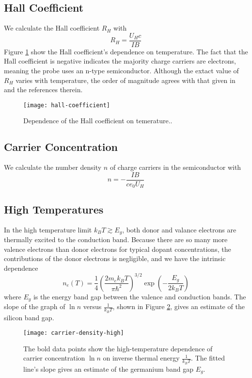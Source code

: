\documentclass[11pt, a4paper]{article}
\begin{document}
\subsection{Hall Coefficient}
We calculate the Hall coefficient $ R_{H} $ with
\begin{equation*}
	R_{H} =  \frac{U_{H}c}{IB}
\end{equation*}
Figure \ref{hall:fig:coefficient} show the Hall coefficient's dependence on temperature.  The fact that the Hall coefficient is negative indicates the majority charge carriers are electrons, meaning the probe uses an n-type semiconductor. Although the extact value of $ R_{H} $ varies with temperature, the order of magnitude agrees with that given in \cite{kuck} and the references therein.
\begin{figure}
\centering
\texttt{[image: hall-coefficient]}
\caption{Dependence of the Hall coefficient on temerature..}
\label{hall:fig:coefficient}
\end{figure}


\subsection{Carrier Concentration}
We calculate the number density $ n $ of charge carriers in the semiconductor with
\begin{equation*}
	n = -\frac{IB}{ce_{0}U_{H}}
\end{equation*}	

\subsection{High Temperatures}	
In the high temperature limit $ k_{B}T \gtrsim E_{g} $, both donor and valance electrons are thermally excited to the conduction band. Because there are so many more valence electrons than donor electrons for typical dopant concentrations, the contributions of the donor electrons is negligible, and we have the intrinsic dependence
\begin{equation*}
	n_{e}(T) = \frac{1}{4}\left(\frac{2m_{e}k_{B}T}{\pi \hbar^{2}}\right)^{3/2}\exp(-\frac{E_{g}}{2k_{B}T})
\end{equation*}
where $ E_{g} $ is the energy band gap between the valence and conduction bands. The slope of the graph of $ \ln n $	versus $ \frac{1}{k_{B}T} $, shown in Figure \ref{hall:fig:n-highT}, gives an estimate of the silicon band gap.
		
		
\begin{figure}
	\centering
	\texttt{[image: carrier-density-high]}
	\caption{The bold data points show the high-temperature dependence of carrier concentration $ \ln n $ on inverse thermal energy $ \frac{1}{k_{B}T} $. The fitted line's slope gives an estimate of the germanium band gap $ E_{g} $.}
	\label{hall:fig:n-highT}
\end{figure}
\end{document}
